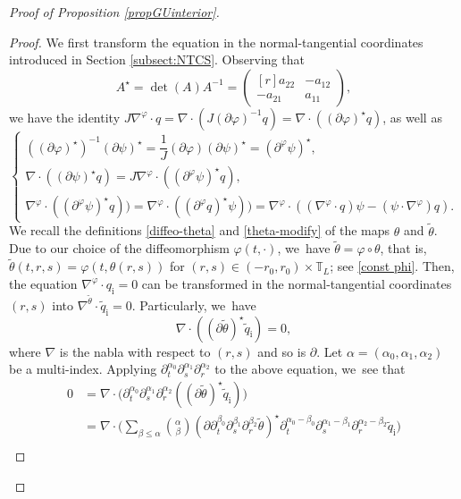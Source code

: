 \documentclass[10pt]{amsart}
\newcommand{\dt}{\partial_t}
\theoremstyle{definition}
\begin{document}
\begin{proof}[Proof of Proposition \ref{propGUinterior}]
\begin{proof}
We first transform the equation in the normal-tangential coordinates introduced in Section \ref{subsect:NTCS}.
Observing that
\[
A^\star = \det(A)A^{-1} =
\begin{pmatrix*}[r]
a_{22} & -a_{12} \\
-a_{21} & a_{11}
\end{pmatrix*},
\]
we have the identity $J\nabla^\varphi\cdot q = \nabla\cdot(J(\partial\varphi)^{-1}q) = \nabla\cdot((\partial\varphi)^\star q)$, as well as
\begin{equation}\label{F4}
\begin{cases}
((\partial\varphi)^\star)^{-1}(\partial\psi)^\star = \dfrac{1}{J}(\partial\varphi)(\partial\psi)^\star = (\partial^\varphi\psi)^\star, \\
\nabla\cdot((\partial\psi)^\star q) = J\nabla^\varphi\cdot((\partial^\varphi\psi)^\star q), \\
\nabla^\varphi\cdot((\partial^\varphi\psi)^\star q)) = \nabla^\varphi\cdot((\partial^\varphi q)^\star \psi))
= \nabla^\varphi\cdot((\nabla^\varphi\cdot q)\psi - (\psi\cdot\nabla^\varphi)q).
\end{cases}
\end{equation}
We recall the definitions \eqref{diffeo-theta} and \eqref{theta-modify} of the maps $\theta$ and $\tilde{\theta}$.
Due to our choice of the diffeomorphism $\varphi(t,\cdot)$, we~have $\tilde{\theta}=\varphi\circ\theta$, that is,
$\tilde{\theta}(t,r,s)=\varphi(t,\theta(r,s))$ for $(r,s)\in(-r_0,r_0)\times\mathbb{T}_L$; see \eqref{const phi}.
Then, the equation $\nabla^\varphi\cdot q_\mathrm{i}=0$ can be transformed in the normal-tangential coordinates $(r,s)$ into
$\nabla^{\tilde{\theta}}\cdot\tilde{q}_\mathrm{i}=0$.
Particularly, we~have
\[
\nabla\cdot((\partial\tilde{\theta})^\star\tilde{q}_\mathrm{i}) = 0,
\]
where $\nabla$ is the nabla with respect to $(r,s)$ and so is $\partial$.
Let $\alpha=(\alpha_0,\alpha_1,\alpha_2)$ be a multi-index.
Applying $\dt^{\alpha_0}\partial_s^{\alpha_1}\partial_r^{\alpha_2}$ to the above equation, we~see that
\begin{align*}
0 &= \nabla\cdot\bigl(\dt^{\alpha_0}\partial_s^{\alpha_1}\partial_r^{\alpha_2}((\partial\tilde{\theta})^\star\tilde{q}_\mathrm{i}) \bigr) \\
&= \nabla\cdot\biggl(\sum_{\beta\leq\alpha} \binom{\alpha}{\beta}
(\partial\dt^{\beta_0}\partial_s^{\beta_1}\partial_r^{\beta_2}\tilde{\theta})^\star
\dt^{\alpha_0-\beta_0}\partial_s^{\alpha_1-\beta_1}\partial_r^{\alpha_2-\beta_2}\tilde{q}_\mathrm{i} \biggr) \\

\end{align*}
\end{proof}
\end{proof}
\end{document}
